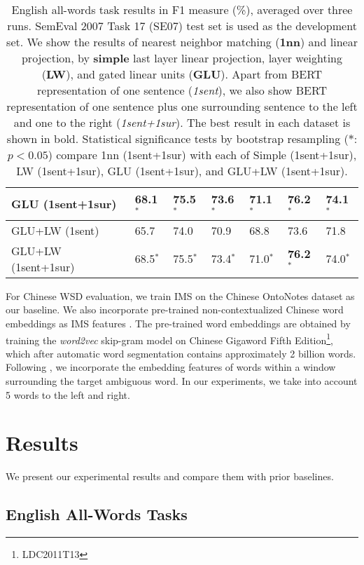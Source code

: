 \documentclass[11pt,a4paper]{article}
\begin{document}
\begin{table*}[ht]
\begin{tabular}{|l|l||l|l|l|l|l|}
GLU (1sent+1sur) & 68.1$^{*}$ & 75.5$^{*}$ & 73.6$^{*}$ & \textbf{71.1}$^{*}$ & \textbf{76.2}$^{*}$ & \textbf{74.1}$^{*}$\\\hline
GLU+LW (1sent) & 65.7 & 74.0 & 70.9 & 68.8 & 73.6 & 71.8 \\ 
GLU+LW (1sent+1sur) & 68.5$^{*}$ & 75.5$^{*}$ & 73.4$^{*}$ & 71.0$^{*}$ & \textbf{76.2}$^{*}$ & 74.0$^{*}$\\
\hline
\end{tabular}
\caption{\label{tab:results_aw} English all-words task results in F1 measure (\%), averaged over three runs. SemEval 2007 Task 17 (SE07) test set is used as the development set. We show the results of nearest neighbor matching (\textbf{1nn}) and linear projection, by \textbf{simple} last layer linear projection, layer weighting (\textbf{LW}), and gated linear units (\textbf{GLU}). Apart from BERT representation of one sentence (\textit{1sent}), we also show BERT representation of one sentence plus one surrounding sentence to the left and one to the right (\textit{1sent+1sur}). The best result in each dataset is shown in bold. Statistical significance tests by bootstrap resampling ($*$: $p<0.05$) compare 1nn (1sent+1sur) with each of Simple (1sent+1sur), LW (1sent+1sur), GLU (1sent+1sur), and GLU+LW (1sent+1sur).}
\end{table*} 
For Chinese WSD evaluation, we train IMS \cite{zhong_it_2010} on the Chinese OntoNotes dataset as our baseline. We also incorporate pre-trained non-contextualized Chinese word embeddings as IMS features \cite{taghipour_semi-supervised_2015,iacobacci_embeddings_2016}. The pre-trained word embeddings are obtained by training the \textit{word2vec} skip-gram model on Chinese Gigaword Fifth Edition\footnote{LDC2011T13}, which after automatic word segmentation contains approximately 2 billion words. Following \cite{taghipour_semi-supervised_2015}, we incorporate the embedding features of words within a window surrounding the target ambiguous word. In our experiments, we take into account 5 words to the left and right.

\section{Results}
\label{sec:results}

We present our experimental results and compare them with prior baselines.

\subsection{English All-Words Tasks}
\label{sec:results_aw}
\end{document}
